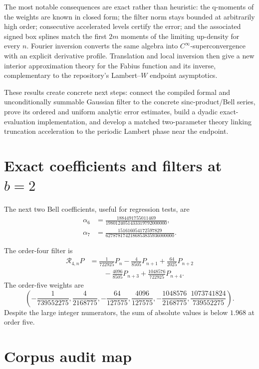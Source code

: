 \documentclass[11pt,oneside]{article}
\numberwithin{equation}{section}
\theoremstyle{definition}
\theoremstyle{remark}
\begin{document}
The most notable consequences are exact rather than heuristic: the q-moments of
the weights are known in closed form; the filter norm stays bounded at arbitrarily
high order; consecutive accelerated levels certify the error; and the associated
signed box splines match the first \(2m\) moments of the limiting up-density for
every \(n\). Fourier inversion converts the same algebra into
\(C^\infty\)-superconvergence with an explicit derivative profile. Translation
and local inversion then give a new interior approximation theory for the Fabius
function and its inverse, complementary to the repository's Lambert--\(W\)
endpoint asymptotics.

These results create concrete next steps: connect the compiled formal and
unconditionally summable Gaussian filter to the concrete sinc-product/Bell
series, prove its ordered and uniform analytic error estimates, build a dyadic
exact-evaluation implementation, and develop a matched
two-parameter theory linking truncation acceleration to the periodic Lambert
phase near the endpoint.

\appendix

\section{Exact coefficients and filters at \texorpdfstring{\(b=2\)}{b=2}}
\label{p2:app:coeff}

The next two Bell coefficients, useful for regression tests, are
\begin{align*}
 \alpha_6&=\frac{1884491755011469}
 {1980124051433319792000000},\\
 \alpha_7&=\frac{151616054172597829}
 {6278781742186853835936000000}.
\end{align*}

The order-four filter is
\begin{align*}
 \mathcal R_{4,n}P
 &=\frac1{722925}P_n-\frac4{8505}P_{n+1}
 +\frac{64}{2025}P_{n+2}\\
 &\qquad-\frac{4096}{8505}P_{n+3}
 +\frac{1048576}{722925}P_{n+4}.
\end{align*}
The order-five weights are
\[
 \left(
 -\frac1{739552275},\frac4{2168775},-\frac{64}{127575},
 \frac{4096}{127575},-\frac{1048576}{2168775},
 \frac{1073741824}{739552275}
 \right).
\]
Despite the large integer numerators, the sum of absolute values is below
\(1.968\) at order five.

\section{Corpus audit map}
\label{p2:app:corpus}
\end{document}
